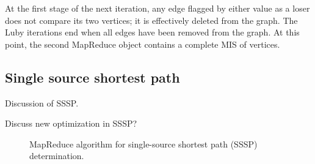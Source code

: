 At the first stage of the next iteration, any edge flagged by either
value as a loser does not compare its two vertices; it is effectively
deleted from the graph.  The Luby iterations end when all edges have
been removed from the graph.  At this point, the second MapReduce
object contains a complete MIS of vertices.

\subsection{Single source shortest path}

Discussion of SSSP.

Discuss new optimization in SSSP?

\begin{figure}[htb]
 \begin{center}\end{center}

 \caption{MapReduce algorithm for single-source shortest path (SSSP)
 determination.}

 \label{fig:sssp}
\end{figure}

